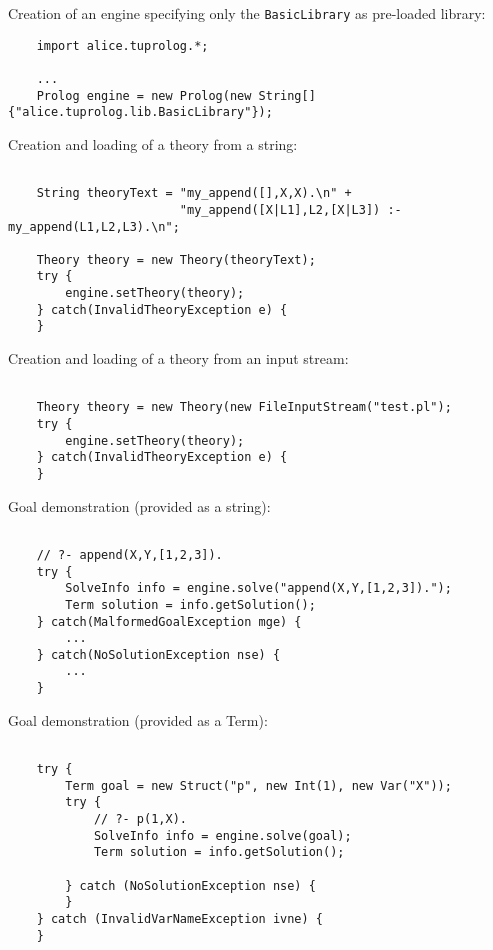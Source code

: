 \noindent Creation of an engine specifying only the
\texttt{BasicLibrary} as pre-loaded library:

{\tt\scriptsize{
\begin{verbatim}
    import alice.tuprolog.*;

    ...
    Prolog engine = new Prolog(new String[]{"alice.tuprolog.lib.BasicLibrary"});
\end{verbatim} }}

\noindent Creation and loading of a theory from a string:

{\tt\scriptsize{\begin{verbatim}

    String theoryText = "my_append([],X,X).\n" +
                        "my_append([X|L1],L2,[X|L3]) :- my_append(L1,L2,L3).\n";

    Theory theory = new Theory(theoryText);
    try {
        engine.setTheory(theory);
    } catch(InvalidTheoryException e) {
    }
\end{verbatim} }}

\noindent Creation and loading of a theory from an input stream:

{\tt\scriptsize{\begin{verbatim}

    Theory theory = new Theory(new FileInputStream("test.pl");
    try {
        engine.setTheory(theory);
    } catch(InvalidTheoryException e) {
    }
\end{verbatim} }}

\noindent Goal demonstration (provided as a string):

{\tt\scriptsize{\begin{verbatim}

    // ?- append(X,Y,[1,2,3]).
    try {
        SolveInfo info = engine.solve("append(X,Y,[1,2,3]).");
        Term solution = info.getSolution();
    } catch(MalformedGoalException mge) {
        ...
    } catch(NoSolutionException nse) {
        ...
    }
\end{verbatim} }}

\noindent Goal demonstration (provided as a Term):

{\tt\scriptsize{\begin{verbatim}

    try {
        Term goal = new Struct("p", new Int(1), new Var("X"));
        try {
            // ?- p(1,X).
            SolveInfo info = engine.solve(goal);
            Term solution = info.getSolution();
 
        } catch (NoSolutionException nse) {
        }
    } catch (InvalidVarNameException ivne) {
    }
\end{verbatim} }}

